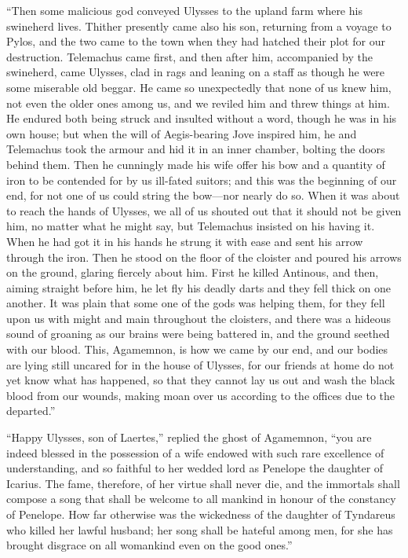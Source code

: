 “Then some malicious god conveyed Ulysses to the upland farm where his
swineherd lives. Thither presently came also his son, returning from a voyage
to Pylos, and the two came to the town when they had hatched their plot for our
destruction. Telemachus came first, and then after him, accompanied by the
swineherd, came Ulysses, clad in rags and leaning on a staff as though he were
some miserable old beggar. He came so unexpectedly that none of us knew him,
not even the older ones among us, and we reviled him and threw things at him.
He endured both being struck and insulted without a word, though he was in his
own house; but when the will of Aegis-bearing Jove inspired him, he and
Telemachus took the armour and hid it in an inner chamber, bolting the doors
behind them. Then he cunningly made his wife offer his bow and a quantity of
iron to be contended for by us ill-fated suitors; and this was the beginning of
our end, for not one of us could string the bow—nor nearly do so. When it was
about to reach the hands of Ulysses, we all of us shouted out that it should
not be given him, no matter what he might say, but Telemachus insisted on his
having it. When he had got it in his hands he strung it with ease and sent his
arrow through the iron. Then he stood on the floor of the cloister and poured
his arrows on the ground, glaring fiercely about him. First he killed Antinous,
and then, aiming straight before him, he let fly his deadly darts and they fell
thick on one another. It was plain that some one of the gods was helping them,
for they fell upon us with might and main throughout the cloisters, and there
was a hideous sound of groaning as our brains were being battered in, and the
ground seethed with our blood. This, Agamemnon, is how we came by our end, and
our bodies are lying still uncared for in the house of Ulysses, for our friends
at home do not yet know what has happened, so that they cannot lay us out and
wash the black blood from our wounds, making moan over us according to the
offices due to the departed.”

“Happy Ulysses, son of Laertes,” replied the ghost of Agamemnon, “you are
indeed blessed in the possession of a wife endowed with such rare excellence of
understanding, and so faithful to her wedded lord as Penelope the daughter of
Icarius. The fame, therefore, of her virtue shall never die, and the immortals
shall compose a song that shall be welcome to all mankind in honour of the
constancy of Penelope. How far otherwise was the wickedness of the daughter of
Tyndareus who killed her lawful husband; her song shall be hateful among men,
for she has brought disgrace on all womankind even on the good ones.”

